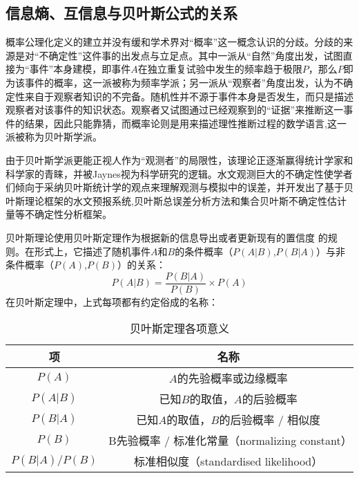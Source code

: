 \subsection{信息熵、互信息与贝叶斯公式的关系}
概率公理化定义\cite{kolmogorov1950foundations}的建立并没有缓和学术界对``概率''这一概念认识的分歧。分歧的来源是对``不确定性''这件事的出发点与立足点。其中一派从``自然''角度出发，试图直接为``事件''本身建模，即事件$A$在独立重复试验中发生的频率趋于极限$P$，那么$P$即为该事件的概率，这一派被称为频率学派；另一派从``观察者''角度出发，认为不确定性来自于观察者知识的不完备。随机性并不源于事件本身是否发生，而只是描述观察者对该事件的知识状态。观察者又试图通过已经观察到的``证据''来推断这一事件的结果，因此只能靠猜，而概率论则是用来描述理性推断过程的数学语言,这一派被称为贝叶斯学派。

由于贝叶斯学派更能正视人作为``观测者''的局限性，该理论正逐渐赢得统计学家和科学家的青睐\cite{jeffreys1998theory,cox1946probability}，并被Jaynes视为科学研究的逻辑\cite{jaynes2003probability}。水文观测巨大的不确定性使学者们倾向于采纳贝叶斯统计学的观点来理解观测与模拟中的误差，并开发出了基于贝叶斯理论框架的水文预报系统\cite{krzysztofowicz1999bayesian},贝叶斯总误差分析方法\cite{kavetski2006bayesian}和集合贝叶斯不确定性估计量\cite{ajami2007integrated}等不确定性分析框架。

贝叶斯理论使用贝叶斯定理作为根据新的信息导出或者更新现有的置信度
的规则。在形式上，它描述了随机事件$A$和$B$的条件概率（$P(A|B)$,$P(B|A)$）与非条件概率（$P(A)$,$P(B)$）的关系：
\begin{equation}
\label{bayes}
P(A|B) = \frac{P(B | A)}{P(B)}\times  P(A)
\end{equation}
在贝叶斯定理中，上式每项都有约定俗成的名称：

\begin{table}[H] 
\centering
\caption{贝叶斯定理各项意义}
\begin{tabular}{cc}
\toprule[1.5 pt]
  项 &  名称\\
\midrule[1pt] 
$P(A)$& $A$的先验概率或边缘概率\\
$P(A|B)$& 已知$B$的取值，$A$的后验概率\\
$P(B|A)$& 已知$A$的取值，$B$的后验概率 / 相似度\\
$P(B)$& B先验概率 / 标准化常量（normalizing 
constant）\\
$P(B | A)/ P(B)$& 标准相似度（standardised 
likelihood）\\
\bottomrule[1.5 pt] 
\end{tabular}
\end{table}

